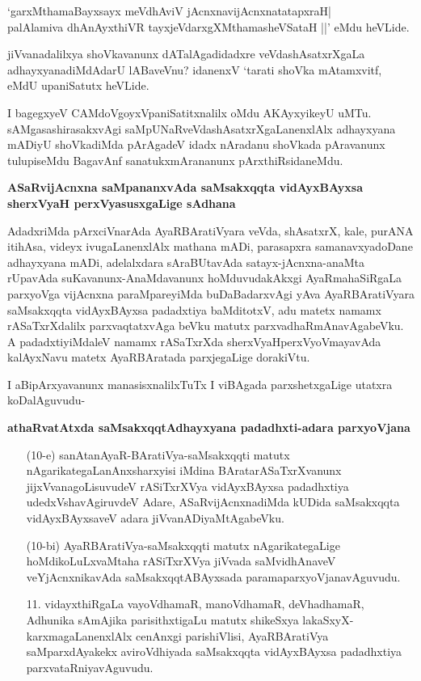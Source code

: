\begin{shloka}
`garxMthamaBayxsayx meVdhAviV jAcnxnavijAcnxnatatapxraH|\\\label{42}
palAlamiva dhAnAyxthiVR tayxjeVdarxgXMthamasheVSataH ||' eMdu heVLide.
\end{shloka}

jiVvanadalilxya shoVkavanunx dATalAgadidadxre veVdashAsatxrXgaLa adhayxyanadiMdAdarU lABaveVnu? idanenxV `tarati shoVka mAtamxvitf,\label{42} eMdU upaniSatutx heVLide.

I bagegxyeV CAMdoVgoyxVpaniSatitxnalilx oMdu AKAyxyikeyU uMTu. sAMgasashirasakxvAgi saMpUNaRveVdashAsatxrXgaLanenxlAlx adhayxyana mADiyU shoVkadiMda pArAgadeV idadx nAradanu shoVkada pAravanunx tulupiseMdu BagavAnf sanatukxmArananunx pArxthiRsidaneMdu.

\noindent
\textbf{ASaRvijAcnxna saMpananxvAda saMsakxqqta vidAyxBAyxsa sherxVyaH perxVyasusxgaLige sAdhana}\label{page42}

AdadxriMda pArxciVnarAda AyaRBAratiVyara veVda, shAsatxrX, kale, purANA itihAsa, videyx ivugaLanenxlAlx mathana mADi, parasapxra samanavxyadoDane adhayxyana mADi, adelalxdara sAraBUtavAda satayx-jAcnxna-anaMta rUpavAda suKavanunx-AnaMdavanunx hoMduvudakAkxgi AyaRmahaSiRgaLa parxyoVga vijAcnxna paraMpareyiMda buDaBadarxvAgi yAva AyaRBAratiVyara saMsakxqqta vidAyxBAyxsa \-padadxtiya baMditotxV, adu matetx namamx rASaTxrXdalilx parxvaqtatxvAga beVku matutx parxvadhaRmAnavAgabeVku. A padadxtiyiMdaleV namamx rASaTxrXda sherxVyaHperxVyoVmayavAda kalAyxNavu matetx AyaRBAratada parxjegaLige dorakiVtu.

I aBipArxyavanunx manasisxnalilxTuTx I viBAgada parxshetxgaLige utatxra koDalAguvudu-

\noindent
\textbf{athaRvatAtxda saMsakxqqtAdhayxyana padadhxti-adara parxyoVjana}\label{page4}

\begin{itemize}
\item[(10-e)] sanAtanAyaR-BAratiVya-saMsakxqqti matutx nAgarikategaLanAnxsharxyisi iMdina BAratarASaTxrXvanunx jijxVvanagoLisuvudeV rASiTxrXVya vidAyxBAyxsa padadhxtiya udedxVshavAgiruvdeV Adare, ASaRvijAcnxnadiMda kUDida saMsakxqqta vidAyxBAyxsaveV adara jiVvanADiyaMtAgabeVku.

\item[(10-bi)] AyaRBAratiVya-saMsakxqqti matutx nAgarikategaLige hoMdikoLuLxvaMtaha rASiTxrXVya jiVvada saMvidhAnaveV veYjAcnxnikavAda saMsakxqqtABAyxsada paramaparxyoVjanavAguvudu. 

\item[11.] vidayxthiRgaLa vayoVdhamaR, manoVdhamaR, deVhadhamaR, Adhunika sAmAjika parisithxtigaLu matutx shikeSxya lakaSxyX-karxmagaLanenxlAlx cenAnxgi parishiVlisi, AyaRBAratiVya saMparxdAyakekx aviroVdhiyada saMsakxqqta vidAyxBAyxsa padadhxtiya parxvataRniyavAguvudu.
\end{itemize}


